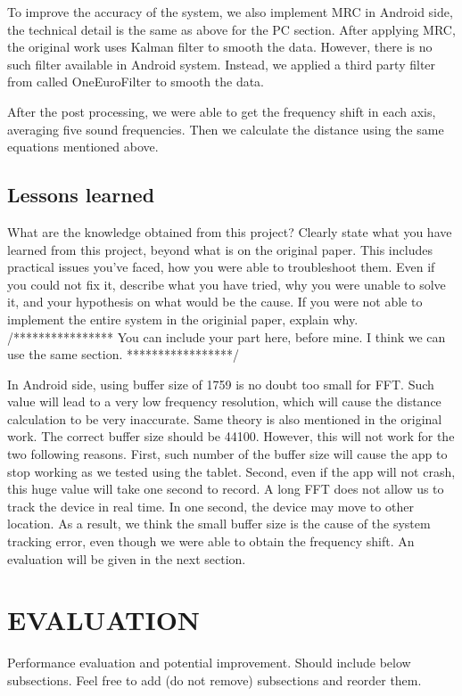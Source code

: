 \documentclass{acm_proc_article-sp}
\begin{document}
To improve the accuracy of the system, we also implement MRC in Android side, the 
technical detail is the same as above for the PC section. After applying MRC, the original
work uses Kalman filter to smooth the data. However, there is no such filter available in
Android system. Instead, we applied a third party filter from
\cite{SignalFilter} called OneEuroFilter to smooth the data.

After the post processing, we were able to get the frequency shift in each axis, averaging
five sound frequencies. Then we calculate the distance using the same equations mentioned
above.

\subsection{Lessons learned}
What are the knowledge obtained from this project? Clearly
state what you have learned from this project, beyond what
is on the original paper. This includes practical issues you’ve
faced, how you were able to troubleshoot them.  Even if you
could not fix it, describe what you have tried, why you were
unable to solve it, and your hypothesis on what would be the
cause.  If you were not able to implement the entire system
in the originial paper, explain why.
/****************
You can include your part here, before mine. I think we can use the same section.
*****************/

In Android side, using buffer size of 1759 is no doubt too small for FFT. Such value
will lead to a very low frequency resolution, which will cause the distance calculation
to be very inaccurate. Same theory is also mentioned in the original work. The correct
buffer size should be 44100. However, this will not work for the two following reasons.
First, such number of the buffer size will cause the app to stop working as we tested 
using the tablet. Second, even if the app will not crash, this huge value will take one
second to record. A long FFT does not allow us to track the device in real time. In one
second, the device may move to other location. As a result, we think the small buffer size
is the cause of the system tracking error, even though we were able to obtain the
frequency shift. An evaluation will be given in the next section.

\section{EVALUATION} \label{evaluation}
Performance evaluation and potential improvement.  Should
include below subsections.  Feel free to add (do not remove)
subsections and reorder them.
\end{document}
